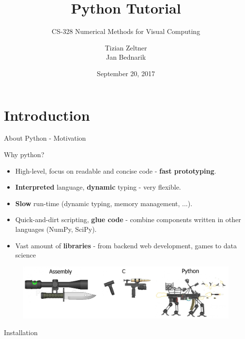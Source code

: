 \documentclass[10pt]{beamer}
\title{Python Tutorial}
\subtitle{CS-328 Numerical Methods for Visual Computing}
\date{September 20, 2017}
\author{Tizian Zeltner\\
Jan Bednarik}
\begin{document}
\maketitle


\section{Introduction}


\begin{frame}{About Python - Motivation}

Why python?

\begin{itemize}
\item \pause High-level, focus on readable and concise code - \textbf{fast prototyping}.
\item \pause \textbf{Interpreted} language, \textbf{dynamic} typing - very flexible.
\item \pause \textbf{Slow} run-time (dynamic typing, memory management, ...).
\item \pause Quick-and-dirt scripting, \textbf{glue code} - combine components written in other languages (NumPy, SciPy).
\item \pause Vast amount of \textbf{libraries} - from backend web development, games to data science
\end{itemize}

\pause
\begin{figure}[!h]
	\centering
	\includegraphics[width=0.9\linewidth]{img/python_vs_others.png}		
\end{figure}

\end{frame}


\begin{frame}{Installation}
%
\end{frame}
\end{document}
